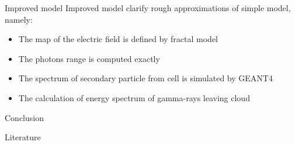 \documentclass[final,hyperref={pdfpagelabels=false}]{beamer}
\begin{document}
\begin{frame}{}
\begin{columns}[t]
\begin{column}{0.32\linewidth}
                \begin{block}{Improved model}
                    Improved model clarify  rough approximations of simple model, namely:
                    \begin{itemize}
                        \item The map of the electric field is defined by fractal model ~\cite{Iudin:2018}
                        \item The photons range is computed exactly
                        \item The spectrum of secondary particle from cell is simulated by GEANT4~\cite{ALLISON2016186}
                        \item The calculation of energy spectrum of gamma-rays leaving cloud
                    \end{itemize}
                    
                    
                    
                    
                \end{block}
                
                \begin{block}{Conclusion}
                    
                \end{block}
                \begin{block}{Literature}
                    
                    {}
                \end{block}
                
            \end{column}%
            
        \end{columns}
        
        
    \end{frame}
\end{document}
